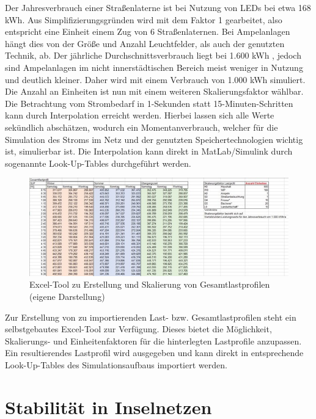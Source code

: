 Der Jahresverbrauch einer Straßenlaterne ist bei Nutzung von LEDs bei etwa 168 kWh. 
Aus Simplifizierungsgründen wird mit dem Faktor 1 gearbeitet, also entspricht eine Einheit einem Zug von 6 Straßenlaternen. 
Bei Ampelanlagen hängt dies von der Größe und Anzahl Leuchtfelder, als auch der genutzten Technik, ab. 
Der jährliche Durchschnittsverbrauch liegt bei 1.600 kWh , jedoch sind Ampelanlagen im nicht innerstädtischen Bereich meist weniger in Nutzung und deutlich kleiner. 
Daher wird mit einem Verbrauch von 1.000 kWh simuliert. Die Anzahl an Einheiten ist nun mit einem weiteren Skalierungsfaktor wählbar.
Die Betrachtung vom Strombedarf in 1-Sekunden statt 15-Minuten-Schritten kann durch Interpolation erreicht werden. 
Hierbei lassen sich alle Werte sekündlich abschätzen, wodurch ein Momentanverbrauch, welcher für die Simulation des Stroms im Netz und der genutzten Speichertechnologien wichtig ist, simulierbar ist. 
Die Interpolation kann direkt in MatLab/Simulink durch sogenannte Look-Up-Tables durchgeführt werden.
 
\begin{figure}[h!]
    \centering
    \includegraphics[width=14cm]{Abbildungen/VerbraucherAbb4.jpg}
    \caption{Excel-Tool zu Erstellung und Skalierung von Gesamtlastprofilen (eigene Darstellung)}\label{fig:Excel-Tool_zu_Erstellung_und_Skalierung_von_Gesamtlastprofilen}
\end{figure}

Zur Erstellung von zu importierenden Last- bzw. Gesamtlastprofilen steht ein selbstgebautes Excel-Tool zur Verfügung. 
Dieses bietet die Möglichkeit, Skalierungs- und Einheitenfaktoren für die hinterlegten Lastprofile anzupassen. 
Ein resultierendes Lastprofil wird ausgegeben und kann direkt in entsprechende Look-Up-Tables des Simulationsaufbaus importiert werden.

\section{Stabilität in Inselnetzen}


